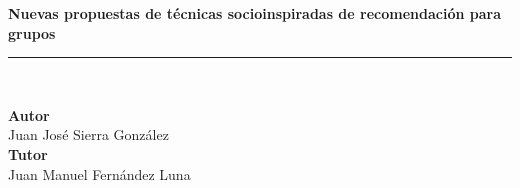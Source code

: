 \begin{titlepage}
 
 
\setlength{\centeroffset}{-0.5\oddsidemargin}
\addtolength{\centeroffset}{0.5\evensidemargin}
\thispagestyle{empty}

\noindent\hspace*{\centeroffset}\begin{minipage}{\textwidth}

\centering

% 

 \vspace{3.3cm}

 \vspace{0.5cm}


{\Huge\bfseries Nuevas propuestas de técnicas socioinspiradas de recomendación para grupos\\
}
\noindent\rule[-1ex]{\textwidth}{2pt}\\[3.5ex]
\end{minipage}

\vspace{2.5cm}
\noindent\hspace*{\centeroffset}\begin{minipage}{\textwidth}
\centering

\textbf{Autor}\\ {Juan José Sierra González}\\[2.5ex]
\textbf{Tutor}\\
{Juan Manuel Fernández Luna}\\[2cm]
\end{minipage}

 
\end{titlepage}


